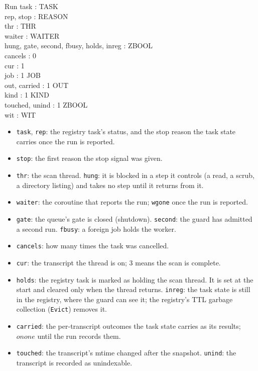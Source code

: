 \documentclass[a4paper,10pt,fleqn]{article}
\newcommand{\field}[1]{\texttt{#1}}
\begin{document}
\begin{schema}{Run}
task : TASK \\
rep, stop : REASON \\
thr : THR \\
waiter : WAITER \\
hung, gate, second, fbusy, holds, inreg : ZBOOL \\
cancels : 0  \\
cur : 1  \\
job : 1  \fun JOB \\
out, carried : 1  \fun OUT \\
kind : 1  \fun KIND \\
touched, unind : 1  \fun ZBOOL \\
wit : \power WIT
\end{schema}

\begin{itemize}
  \item \field{task}, \field{rep}: the registry task's status, and the stop
    reason the task state carries once the run is reported.
  \item \field{stop}: the first reason the stop signal was given.
  \item \field{thr}: the scan thread. \field{hung}: it is blocked in a step it
    controls (a read, a scrub, a directory listing) and takes no step until it
    returns from it.
  \item \field{waiter}: the coroutine that reports the run; \field{wgone} once
    the run is reported.
  \item \field{gate}: the queue's gate is closed (shutdown). \field{second}: the
    guard has admitted a second run. \field{fbusy}: a foreign job holds the
    worker.
  \item \field{cancels}: how many times the task was cancelled.
  \item \field{cur}: the transcript the thread is on; $3$ means the scan is
    complete.
  \item \field{holds}: the registry task is marked as holding the scan thread. It
    is set at the start and cleared only when the thread returns.
    \field{inreg}: the task state is still in the registry, where the guard can
    see it; the registry's TTL garbage collection (\field{Evict}) removes it.
  \item \field{carried}: the per-transcript outcomes the task state carries as its
    results; $\mathit{onone}$ until the run records them.
  \item \field{touched}: the transcript's mtime changed after the snapshot.
    \field{unind}: the transcript is recorded as unindexable.
\end{itemize}
\end{document}
